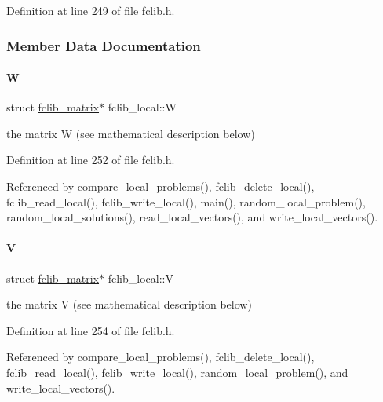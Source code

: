 Definition at line 249 of file fclib.\+h.



\subsubsection{Member Data Documentation}
\mbox{\label{structfclib__local_a981b5abb9acf3f99dffe9a05602ad864}} 
\paragraph{\texorpdfstring{W}{W}}
{\footnotesize\ttfamily struct \mbox{\hyperlink{structfclib__matrix}{fclib\+\_\+matrix}}$\ast$ fclib\+\_\+local\+::W}



the matrix W (see mathematical description below) 



Definition at line 252 of file fclib.\+h.



Referenced by compare\+\_\+local\+\_\+problems(), fclib\+\_\+delete\+\_\+local(), fclib\+\_\+read\+\_\+local(), fclib\+\_\+write\+\_\+local(), main(), random\+\_\+local\+\_\+problem(), random\+\_\+local\+\_\+solutions(), read\+\_\+local\+\_\+vectors(), and write\+\_\+local\+\_\+vectors().

\mbox{\label{structfclib__local_a516663ee92260f82283b4933f7e098cf}} 
\paragraph{\texorpdfstring{V}{V}}
{\footnotesize\ttfamily struct \mbox{\hyperlink{structfclib__matrix}{fclib\+\_\+matrix}}$\ast$ fclib\+\_\+local\+::V}



the matrix V (see mathematical description below) 



Definition at line 254 of file fclib.\+h.



Referenced by compare\+\_\+local\+\_\+problems(), fclib\+\_\+delete\+\_\+local(), fclib\+\_\+read\+\_\+local(), fclib\+\_\+write\+\_\+local(), random\+\_\+local\+\_\+problem(), and write\+\_\+local\+\_\+vectors().

